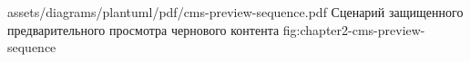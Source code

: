 \appendixdiagram
  {assets/diagrams/plantuml/pdf/cms-preview-sequence.pdf}
  {Сценарий защищенного предварительного просмотра чернового контента}
  {fig:chapter2-cms-preview-sequence}
